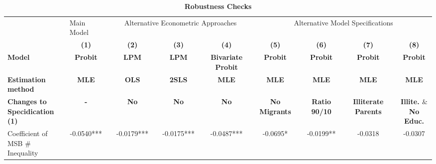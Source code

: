 \documentclass[a4paper, 12pt]{article}
\begin{document}
\begin{table}[H]
  \centering
\caption{\textbf{Robustness Checks}}
\vspace*{-2mm}
 \begin{adjustbox}{max width=\textwidth}
    \begin{tabular}{llllllllllllllll}
    \toprule
          & Main Model &       & \multicolumn{5}{c}{Alternative Econometric Approaches} &       & \multicolumn{7}{c}{Alternative Model Specifications} \\
\cmidrule{2-2}\cmidrule{4-8}\cmidrule{10-16}          & \multicolumn{1}{c}{\textbf{(1)}} &       & \multicolumn{1}{c}{\textbf{(2)}} &       & \multicolumn{1}{c}{\textbf{(3)}} &       & \multicolumn{1}{c}{\textbf{(4)}} &       & \multicolumn{1}{c}{\textbf{(5)}} &       & \multicolumn{1}{c}{\textbf{(6)}} &       & \multicolumn{1}{c}{\textbf{(7)}} &       & \multicolumn{1}{c}{\textbf{(8)}} \\
    \textbf{Model} & \multicolumn{1}{c}{\textbf{Probit}} &       & \multicolumn{1}{c}{\textbf{LPM}} &       & \multicolumn{1}{c}{\textbf{LPM}} &       & \multicolumn{1}{c}{\textbf{Bivariate Probit}} &       & \multicolumn{1}{c}{\textbf{Probit}} &       & \multicolumn{1}{c}{\textbf{Probit}} &       & \multicolumn{1}{c}{\textbf{Probit}} &       & \multicolumn{1}{c}{\textbf{Probit}} \\
    \textbf{Estimation method} & \multicolumn{1}{c}{\textbf{MLE}} &       & \multicolumn{1}{c}{\textbf{OLS}} &       & \multicolumn{1}{c}{\textbf{2SLS}} &       & \multicolumn{1}{c}{\textbf{MLE}} &       & \multicolumn{1}{c}{\textbf{MLE}} &       & \multicolumn{1}{c}{\textbf{MLE}} &       & \multicolumn{1}{c}{\textbf{MLE}} &       & \multicolumn{1}{c}{\textbf{MLE}} \\
    \textbf{Changes to Specidication (1)} & \multicolumn{1}{c}{\textbf{-}} &       & \multicolumn{1}{c}{\textbf{No}} &       & \multicolumn{1}{c}{\textbf{No}} &       & \multicolumn{1}{c}{\textbf{No}} &       & \multicolumn{1}{c}{\textbf{No Migrants}} &       & \multicolumn{1}{c}{\textbf{Ratio 90/10}} &       & \multicolumn{1}{c}{\textbf{Illiterate Parents}} &       & \multicolumn{1}{c}{\textbf{Illite. $\&$ No Educ.}} \\
\cmidrule{2-2}\cmidrule{4-4}\cmidrule{6-6}\cmidrule{8-8}\cmidrule{10-10}\cmidrule{12-12}\cmidrule{14-14}\cmidrule{16-16}    Coefficient of MSB  \# Inequality & \multicolumn{1}{c}{-0.0540***} &       & \multicolumn{1}{c}{-0.0179***} &       & \multicolumn{1}{c}{-0.0175***} &       & \multicolumn{1}{c}{-0.0487***} &       & \multicolumn{1}{c}{-0.0695*} &       & \multicolumn{1}{c}{-0.0199**} &       & \multicolumn{1}{c}{-0.0318} &       & \multicolumn{1}{c}{-0.0307} \\

\end{tabular}
\end{adjustbox}
\end{table}
\end{document}
